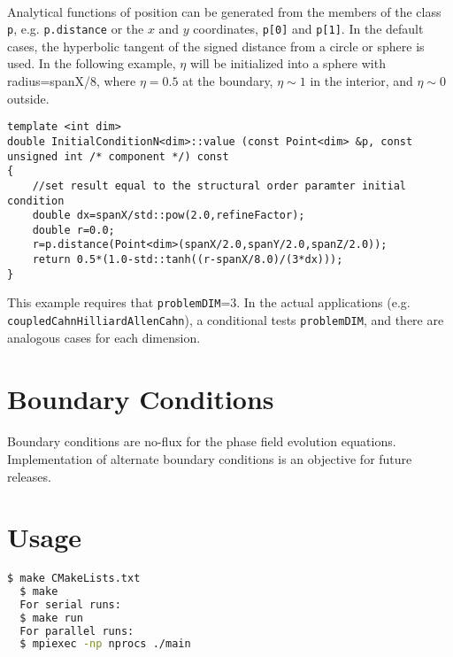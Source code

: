 \documentclass[11pt]{article}
\begin{document}
\paragraph{}
Analytical functions of position can be generated from the members of the class \texttt{p}, e.g. \texttt{p.distance} or the $x$ and $y$ coordinates, \texttt{p[0]} and \texttt{p[1]}.  In the default cases,  the hyperbolic tangent of the signed distance from a circle or sphere is used.  In the following example, $\eta$ will be initialized into a sphere with radius=spanX/8, where $\eta=0.5$ at the boundary, $\eta \sim 1$ in the interior, and $\eta \sim 0$ outside.
\begin{lstlisting}
template <int dim>
double InitialConditionN<dim>::value (const Point<dim> &p, const unsigned int /* component */) const
{
	//set result equal to the structural order paramter initial condition
	double dx=spanX/std::pow(2.0,refineFactor);
	double r=0.0;
	r=p.distance(Point<dim>(spanX/2.0,spanY/2.0,spanZ/2.0));
	return 0.5*(1.0-std::tanh((r-spanX/8.0)/(3*dx)));
}
\end{lstlisting}
This example requires that \texttt{problemDIM}=3.  In the actual applications (e.g. \\\texttt{coupledCahnHilliardAllenCahn}), a conditional tests  \texttt{problemDIM}, and there are analogous cases for each dimension.


\section{Boundary Conditions}
\paragraph{}
Boundary conditions are no-flux for the phase field evolution equations.  Implementation of alternate boundary conditions is an objective for future releases.

\section{Usage}
\paragraph{}
\noindent
\begin{lstlisting}[language=bash]
  $ make CMakeLists.txt
  $ make
  For serial runs:
  $ make run
  For parallel runs:
  $ mpiexec -np nprocs ./main
\end{lstlisting}
\end{document}
